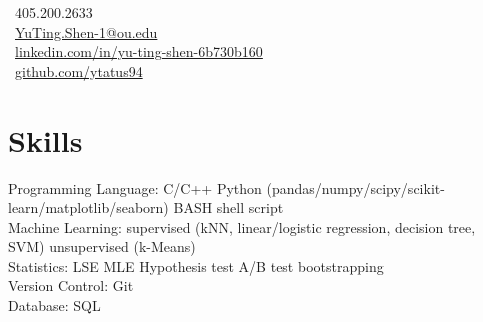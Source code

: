 \documentclass[letterpaper]{deedy-resume-openfont}
\begin{document}
%
%
\lastupdated

%
%

{
    \faPhone \ 405.200.2633\\
    \faEnvelope \ \href{mailto:YuTing.Shen-1@ou.edu}{YuTing.Shen-1@ou.edu}\\
    \faLinkedinSquare \ \href{https://www.linkedin.com/in/yu-ting-shen-6b730b160/}{linkedin.com/in/yu-ting-shen-6b730b160}\\
    \faGithub \ \href{https://github.com/ytatus94}{github.com/ytatus94}
}




\section{Skills}

\raggedright{
    Programming Language:
    C/C++
    \textbullet{}
    Python (pandas/numpy/scipy/scikit-learn/matplotlib/seaborn)
    \textbullet{}
    BASH shell script\\
    Machine Learning:
    supervised (kNN, linear/logistic regression, decision tree, SVM)
    \textbullet{}
    unsupervised (k-Means)\\
    Statistics:
    LSE
    \textbullet{}
    MLE
    \textbullet{}
    Hypothesis test
    \textbullet{}
    A/B test
    \textbullet{}
    bootstrapping\\
    Version Control:
    Git\\
    Database:
    SQL
}
\sectionsep
\end{document}
